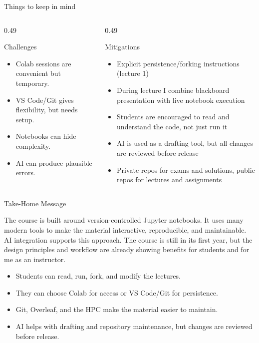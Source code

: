 \documentclass[aspectratio=169,11pt]{beamer}
\begin{document}
\begin{frame}{Things to keep in mind}
  \begin{columns}[T,totalwidth=\textwidth]
    \begin{column}{0.49\textwidth}
      \begin{block}{Challenges}
        \begin{itemize}
          \item Colab sessions are convenient but temporary.
          \item VS Code/Git gives flexibility, but needs setup.
          \item Notebooks can hide complexity.
          \item AI can produce plausible errors.
        \end{itemize}
      \end{block}
    \end{column}
    \begin{column}{0.49\textwidth}
      \begin{block}{Mitigations}
        \begin{itemize}
          \item Explicit persistence/forking instructions (lecture 1)
          \item During lecture I combine blackboard presentation with live notebook execution
          \item Students are encouraged to read and understand the code, not just run it
          \item AI is used as a drafting tool, but all changes are reviewed before release
          \item Private repos for exams and solutions, public repos for lectures and assignments
        \end{itemize}
      \end{block}
    \end{column}
  \end{columns}
\end{frame}

\begin{frame}{Take-Home Message}
  \begin{center}
    \Large
    The course is built around version-controlled Jupyter notebooks. It uses many modern tools to make the material interactive, reproducible, and maintainable. AI integration supports this approach. The course is still in its first year, but the design principles and workflow are already showing benefits for students and for me as an instructor.
  \end{center}
  \vspace{0.4cm}
  \begin{itemize}
    \item Students can read, run, fork, and modify the lectures.
    \item They can choose Colab for access or VS Code/Git for persistence.
    \item Git, Overleaf, and the HPC make the material easier to maintain.
    \item AI helps with drafting and repository maintenance, but changes are reviewed before release.
  \end{itemize}
\end{frame}
\end{document}
